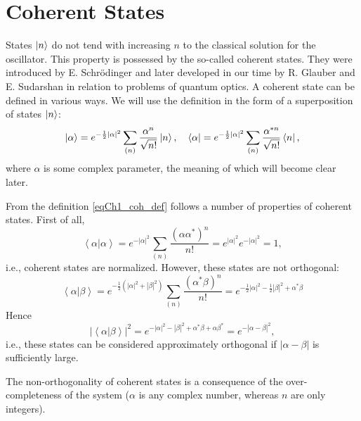 \section{Coherent States}
States $\ket{n}$ do not tend with increasing $n$ to the classical solution for the oscillator. This property is possessed by the so-called coherent states. They were introduced by E. Schrödinger and later developed in our time by R. Glauber \cite{bQuantumOpticsAndRadioPhisicsLecture1966} and E. Sudarshan \cite{bKaluderSudershan1970} in relation to problems of quantum optics. A coherent state can be defined in various ways. We will use the definition in the form of a superposition of states $\ket{n}$:
\begin{equation}
\left|\alpha\right> = e^{-\frac{1}{2} \left|\alpha\right|^2} \sum_{(n)} \frac{\alpha^n}{\sqrt{n!}}\ket{n},
\quad
\left<\alpha\right| = e^{-\frac{1}{2} \left|\alpha\right|^2} \sum_{(n)} \frac{\alpha^{*n}}{\sqrt{n!}}\bra{n},
\label{eqCh1_coh_def}
\end{equation}
where $\alpha$ is some complex parameter, the meaning of which will become clear later.

From the definition \eqref{eqCh1_coh_def} follows a number of properties of coherent states. First of all,
\begin{equation}
\left<\alpha\right|\left.\alpha\right> = e^{-\left|\alpha\right|^2}\sum_{(n)}
\frac{\left(\alpha\alpha^{*}\right)^n}{n!} = e^{\left|\alpha\right|^2} e^{-\left|\alpha\right|^2} = 1,
\end{equation}
i.e., coherent states are normalized. However, these states are not orthogonal:
\begin{equation}
\left<\alpha\right|\left.\beta\right> = 
e^{-\frac{1}{2}\left(\left|\alpha\right|^2 + \left|\beta\right|^2\right)}\sum_{(n)} 
\frac{\left(\alpha^{*}\beta\right)^n}{n!} = 
e^{
-\frac{1}{2} \left|\alpha\right|^2  -\frac{1}{2} \left|\beta\right|^2
+
\alpha^{*} \beta 
}
\label{eqCh1_ortog}
\end{equation}
Hence
\begin{equation}
\left|\left<\alpha\right|\left.\beta\right>\right|^2 = 
e^{
-\left|\alpha\right|^2  - \left|\beta\right|^2
+
\alpha^{*} \beta  + \alpha \beta^{*}} = 
e^{-\left|\alpha - \beta\right|^2}, 
\end{equation}
i.e., these states can be considered approximately orthogonal if $\left|\alpha - \beta\right|$ is sufficiently large.

The non-orthogonality of coherent states is a consequence of the over-completeness of the system ($\alpha$ is any complex number, whereas $n$ are only integers).

